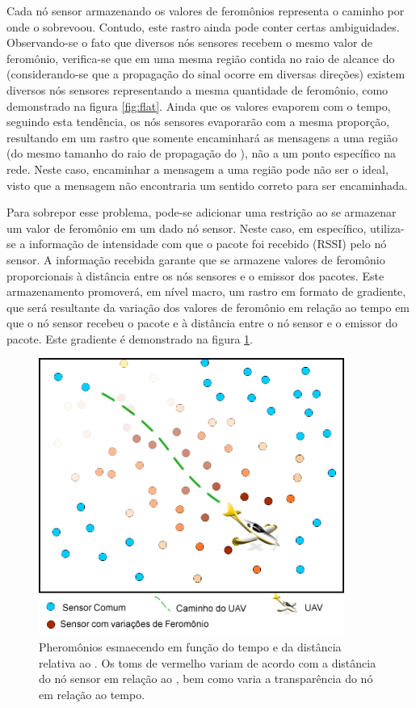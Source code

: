 Cada nó sensor armazenando os valores de feromônios representa o caminho por onde o \vant sobrevoou. Contudo, este rastro ainda pode conter certas ambiguidades. Observando-se o fato que diversos nós sensores recebem o mesmo valor de feromônio, verifica-se que em uma mesma região contida no raio de alcance do \vant (considerando-se que a propagação do sinal ocorre em diversas direções) existem diversos nós sensores representando a mesma quantidade de feromônio, como demonstrado na figura \ref{fig:flat}. Ainda que os valores evaporem com o tempo, seguindo esta tendência, os nós sensores evaporarão com a mesma proporção, resultando em um rastro que somente encaminhará as mensagens a uma região (do mesmo tamanho do raio de propagação do \vant), não a um ponto específico na rede. Neste caso, encaminhar a mensagem a uma região pode não ser o ideal, visto que a mensagem não encontraria um sentido correto para ser encaminhada.



Para sobrepor esse problema, pode-se adicionar uma restrição ao se armazenar um valor de feromônio em um dado nó sensor. Neste caso, em específico, utiliza-se a informação de intensidade com que o pacote foi recebido (RSSI) pelo nó sensor. A informação recebida garante que se armazene valores de feromônio proporcionais à distância entre os nós sensores e o emissor dos pacotes. Este armazenamento promoverá, em nível macro, um rastro em formato de gradiente, que será resultante da variação dos valores de feromônio em relação ao tempo em que o nó sensor recebeu o pacote e à distância entre o nó sensor e o \vant emissor do pacote. Este gradiente é demonstrado na figura \ref{fig:gradient}.

 \begin{figure}[h!]
 \centering
 \includegraphics[width=10cm]{pictures/gradient.png}
 \caption{Pheromônios esmaecendo em função do tempo e da distância relativa ao \vant. Os toms de vermelho variam de acordo com a distância do nó sensor em relação ao \vant, bem como varia a transparência do nó em relação ao tempo.}
  \label{fig:gradient}
 \end{figure}


